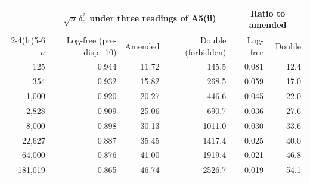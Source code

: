 \begin{tabular}{rrrrrr}
\toprule
 & \multicolumn{3}{c}{$\sqrt n\,\delta_n^2$ under three readings of A5(ii)} & \multicolumn{2}{c}{Ratio to amended} \\
\cmidrule(lr){2-4}\cmidrule(lr){5-6}
$n$ & Log-free (pre-disp.~10) & Amended & Double (forbidden) & Log-free & Double \\
\midrule
125 & 0.944 & 11.72 & 145.5 & 0.081 & 12.4 \\
354 & 0.932 & 15.82 & 268.5 & 0.059 & 17.0 \\
1,000 & 0.920 & 20.27 & 446.6 & 0.045 & 22.0 \\
2,828 & 0.909 & 25.06 & 690.7 & 0.036 & 27.6 \\
8,000 & 0.898 & 30.13 & 1011.0 & 0.030 & 33.6 \\
22,627 & 0.887 & 35.45 & 1417.4 & 0.025 & 40.0 \\
64,000 & 0.876 & 41.00 & 1919.4 & 0.021 & 46.8 \\
181,019 & 0.865 & 46.74 & 2526.7 & 0.019 & 54.1 \\
\bottomrule
\end{tabular}
